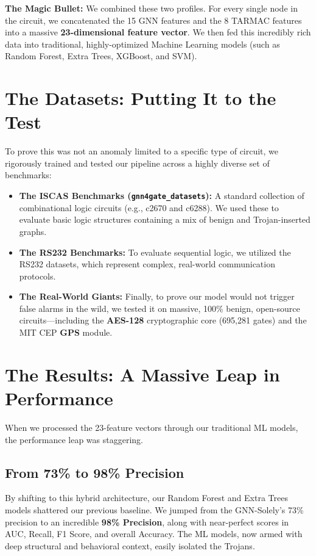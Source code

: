 \documentclass[12pt]{article}
\begin{document}
\textbf{The Magic Bullet:} We combined these two profiles. For every single node in the circuit, we concatenated the 15 GNN features and the 8 TARMAC features into a massive \textbf{23-dimensional feature vector}. We then fed this incredibly rich data into traditional, highly-optimized Machine Learning models (such as Random Forest, Extra Trees, XGBoost, and SVM).

\section{The Datasets: Putting It to the Test}
To prove this was not an anomaly limited to a specific type of circuit, we rigorously trained and tested our pipeline across a highly diverse set of benchmarks:

\begin{itemize}
    \item \textbf{The ISCAS Benchmarks (\texttt{gnn4gate\_datasets}):} A standard collection of combinational logic circuits (e.g., c2670 and c6288). We used these to evaluate basic logic structures containing a mix of benign and Trojan-inserted graphs.
    \item \textbf{The RS232 Benchmarks:} To evaluate sequential logic, we utilized the RS232 datasets, which represent complex, real-world communication protocols.
    \item \textbf{The Real-World Giants:} Finally, to prove our model would not trigger false alarms in the wild, we tested it on massive, 100\% benign, open-source circuits—including the \textbf{AES-128} cryptographic core (695,281 gates) and the MIT CEP \textbf{GPS} module.
\end{itemize}

\section{The Results: A Massive Leap in Performance}
When we processed the 23-feature vectors through our traditional ML models, the performance leap was staggering.

\subsection{From 73\% to 98\% Precision}
By shifting to this hybrid architecture, our Random Forest and Extra Trees models shattered our previous baseline. We jumped from the GNN-Solely's 73\% precision to an incredible \textbf{98\% Precision}, along with near-perfect scores in AUC, Recall, F1 Score, and overall Accuracy. The ML models, now armed with deep structural and behavioral context, easily isolated the Trojans.
\end{document}
